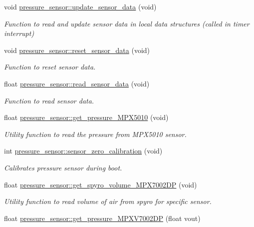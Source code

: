 \begin{DoxyCompactItemize}
void \hyperlink{group___ventilator_module_gac8d67444e99afbc866b1d759cbfde3c5}{pressure\+\_\+sensor\+::update\+\_\+sensor\+\_\+data} (void)
\begin{DoxyCompactList}\small\item\em Function to read and update sensor data in local data structures (called in timer interrupt) \end{DoxyCompactList}\item 
void \hyperlink{group___ventilator_module_ga19fa695e059a50b732d54d1e4325ee99}{pressure\+\_\+sensor\+::reset\+\_\+sensor\+\_\+data} (void)
\begin{DoxyCompactList}\small\item\em Function to reset sensor data. \end{DoxyCompactList}\item 
float \hyperlink{group___ventilator_module_ga06b5da2de0abf739405ca3c48aa0119c}{pressure\+\_\+sensor\+::read\+\_\+sensor\+\_\+data} (void)
\begin{DoxyCompactList}\small\item\em Function to read sensor data. \end{DoxyCompactList}\item 
float \hyperlink{group___ventilator_module_ga5f113f838045ef7cd582cebfcd00c4f0}{pressure\+\_\+sensor\+::get\+\_\+pressure\+\_\+\+M\+P\+X5010} (void)
\begin{DoxyCompactList}\small\item\em Utility function to read the pressure from M\+P\+X5010 sensor. \end{DoxyCompactList}\item 
int \hyperlink{group___ventilator_module_gafd69d3a07ff97d3b68bd952d5286b11a}{pressure\+\_\+sensor\+::sensor\+\_\+zero\+\_\+calibration} (void)
\begin{DoxyCompactList}\small\item\em Calibrates pressure sensor during boot. \end{DoxyCompactList}\item 
float \hyperlink{group___ventilator_module_gab51f616f215d3b4ade2bdd9a3958622d}{pressure\+\_\+sensor\+::get\+\_\+spyro\+\_\+volume\+\_\+\+M\+P\+X7002\+DP} (void)
\begin{DoxyCompactList}\small\item\em Utility function to read volume of air from spyro for specific sensor. \end{DoxyCompactList}\item 
float \hyperlink{group___ventilator_module_ga5eb61c5fdc62a4a0b494a518fc7273ba}{pressure\+\_\+sensor\+::get\+\_\+pressure\+\_\+\+M\+P\+X\+V7002\+DP} (float vout)

\end{DoxyCompactItemize}
